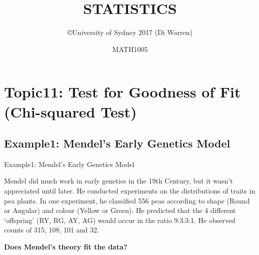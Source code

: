 \documentclass[t,xcolor=pdftex,dvipsnames,table]{beamer}
\title{\Huge STATISTICS}
\subtitle{}
\author{\copyright University of Sydney 2017 (Di Warren)}
\date{MATH1005}
\begin{document}
\section[11]{Topic11: Test for Goodness of Fit (Chi-squared Test)}


\subsection[GoodnessofFit]{Example1: Mendel's Early Genetics Model}
\begin{frame}{Example1: Mendel's Early Genetics Model}

Mendel did much work in early genetics in the 19th Century, but it wasn't appreciated until later. He conducted experiments on the distributions of traits in pea plants. In one experiment, he classified 556 peas according to shape (Round or Angular) and colour (Yellow or Green). He predicted that the 4 different `offspring' (RY, RG, AY, AG) would occur in the ratio 9:3:3:1. He observed counts of 315, 108, 101 and 32. 

\vspace{.5cm}
{\bf Does Mendel's theory fit the data?}

\end{frame}
\end{document}
